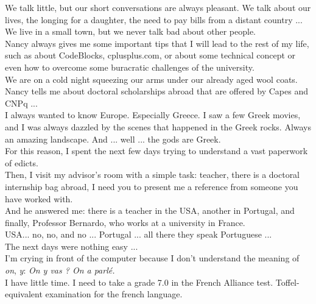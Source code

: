 \documentclass[11pt]{book}
\begin{document}
\noindent We talk little, but our short conversations are always pleasant. We talk about our lives, the longing for a daughter, the need to pay bills from a distant country ... We live in a small town, but we never talk bad about other people. \\

\noindent Nancy always gives me some important tips that I will lead to the rest of my life, such as about CodeBlocks, cplusplus.com, or about some technical concept or even how to overcome some buracratic challenges of the university. \\

\noindent We are on a cold night squeezing our arms under our already aged wool coats. Nancy tells me about doctoral scholarships abroad that are offered by Capes and CNPq ... \\

\noindent I always wanted to know Europe. Especially Greece. I saw a few Greek movies, and I was always dazzled by the scenes that happened in the Greek rocks. Always an amazing landscape. And ... well ... the gods are Greek. \\

\noindent For this reason, I spent the next few days trying to understand a vast paperwork of edicts. \\

\noindent Then, I visit my advisor's room with a simple task: teacher, there is a doctoral internship bag abroad, I need you to present me a reference from someone you have worked with. \\

\noindent And he answered me: there is a teacher in the USA, another in Portugal, and finally, Professor Bernardo, who works at a university in France. \\

\noindent USA... no, no, and no ... Portugal ... all there they speak Portuguese ... \\

\noindent The next days were nothing easy ... \\

\noindent I'm crying in front of the computer because I don't understand the meaning of \emph{on}, \emph{y}: \emph{On y vas ? On a parlé.}  \\

\noindent I have little time. I need to take a grade 7.0 in the French Alliance test. Toffel-equivalent examination for the french language. \\
\end{document}
